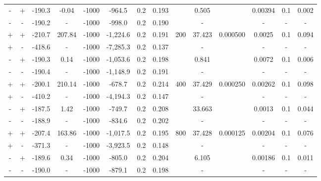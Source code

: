 \documentclass[11pt]{article}
\begin{document}
\begin{table}
{\begin{tabular}{cccccccccccccc}
         - &        + & -190.3 &     -0.04 & -1000 &    -964.5 &  0.2 &  0.193 &   &   0.505 &   &  0.00394 &     0.1 &       0.002 \\
         - &        - & -190.2 &         - & -1000 &    -998.0 &  0.2 &  0.190 &   &       - &   &        - &       - &           - \\ \midrule
         + &        + & -210.7 &    207.84 & -1000 &  -1,224.6 &  0.2 &  0.191 &  \multirow{4}{*}{200} &  37.423 &  \multirow{4}{*}{0.000500} &   0.0025 &     0.1 &       0.094 \\
         + &        - & -418.6 &         - & -1000 &  -7,285.3 &  0.2 &  0.137 &   &       - &   &        - &       - &           - \\
         - &        + & -190.3 &      0.14 & -1000 &  -1,053.6 &  0.2 &  0.198 &   &   0.841 &   &   0.0072 &     0.1 &       0.006 \\
         - &        - & -190.4 &         - & -1000 &  -1,148.9 &  0.2 &  0.191 &   &       - &   &        - &       - &           - \\ \midrule
         + &        + & -200.1 &    210.14 & -1000 &    -678.7 &  0.2 &  0.214 &  \multirow{4}{*}{400} &  37.429 &  \multirow{4}{*}{0.000250} &  0.00262 &     0.1 &       0.098 \\
         + &        - & -410.2 &         - & -1000 &  -4,194.3 &  0.2 &  0.147 &   &       - &   &        - &       - &           - \\
         - &        + & -187.5 &      1.42 & -1000 &    -749.7 &  0.2 &  0.208 &   &  33.663 &   &   0.0013 &     0.1 &       0.044 \\
         - &        - & -188.9 &         - & -1000 &    -834.6 &  0.2 &  0.202 &   &       - &   &        - &       - &           - \\  \midrule
         + &        + & -207.4 &    163.86 & -1000 &  -1,017.5 &  0.2 &  0.195 &  \multirow{4}{*}{800} &  37.428 &  \multirow{4}{*}{0.000125} &  0.00204 &     0.1 &       0.076 \\
         + &        - & -371.3 &         - & -1000 &  -3,923.5 &  0.2 &  0.148 &   &       - &   &        - &       - &           - \\
         - &        + & -189.6 &      0.34 & -1000 &    -805.0 &  0.2 &  0.204 &   &   6.105 &   &  0.00186 &     0.1 &       0.011 \\
         - &        - & -190.0 &         - & -1000 &    -879.1 &  0.2 &  0.198 &   &       - &   &        - &       - &           - \\
\bottomrule
\end{tabular}
}
\end{table}
\end{document}
